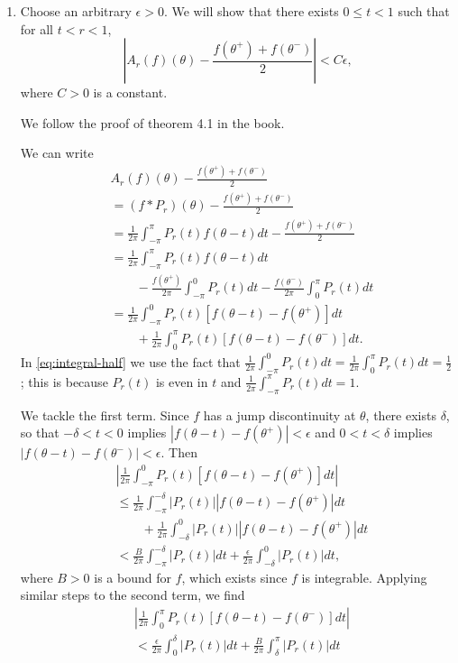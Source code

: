 \documentclass[oneside]{article}
\newcommand\abs[1]{\left|#1\right|}
\begin{document}
  \begin{enumerate}[label=(\alph*)]
    \item
      Choose an arbitrary $\epsilon > 0$. We will show that there exists $0 \leq t < 1$ such that for all $t < r < 1$, \[
        \abs{A_r(f)(\theta) - \frac{f(\theta^+) + f(\theta^-)}{2}} < C\epsilon \text{,}
      \] where $C > 0$ is a constant.

      We follow the proof of theorem 4.1 in the book.

      We can write \begin{align}
        &A_r(f)(\theta) - \frac{f(\theta^+) + f(\theta^-)}{2} \nonumber\\
        &=(f * P_r)(\theta) - \frac{f(\theta^+) + f(\theta^-)}{2} \nonumber\\
        &= \frac{1}{2\pi} \int_{-\pi}^\pi P_r(t)f(\theta - t)dt - \frac{f(\theta^+) + f(\theta^-)}{2} \nonumber\\
        &= \frac{1}{2\pi} \int_{-\pi}^\pi P_r(t)f(\theta - t)dt \label{eq:integral-half}\\
        &\qquad- \frac{f(\theta^+)}{2\pi}\int_{-\pi}^0 P_r(t)dt - \frac{f(\theta^-)}{2\pi}\int_0^\pi P_r(t)dt \nonumber\\
        &= \frac{1}{2\pi}\int_{-\pi}^0 P_r(t)\left[f(\theta-t) - f(\theta^+)\right]dt \nonumber\\
        &\qquad+ \frac{1}{2\pi}\int_0^\pi P_r(t)\left[f(\theta-t) - f(\theta^-)\right]dt \text{.} \nonumber
      \end{align} In \cref{eq:integral-half} we use the fact that $\frac{1}{2\pi}\int_{-\pi}^0 P_r(t)dt = \frac{1}{2\pi}\int_0^\pi P_r(t)dt = \frac{1}{2}$; this is because $P_r(t)$ is even in $t$ and $\frac{1}{2\pi}\int_{-\pi}^\pi P_r(t)dt = 1$.

      We tackle the first term. Since $f$ has a jump discontinuity at $\theta$, there exists $\delta$, so that $-\delta < t < 0$ implies $\abs{f(\theta - t) - f(\theta^+)} < \epsilon$ and $0 < t < \delta$ implies $\abs{f(\theta - t) - f(\theta^-)} < \epsilon$. Then\begin{align*}
        &\abs{\frac{1}{2\pi}\int_{-\pi}^0 P_r(t)\left[f(\theta-t) - f(\theta^+)\right]dt} \\
        &\leq \frac{1}{2\pi} \int_{-\pi}^{-\delta} \abs{P_r(t)} \abs{f(\theta-t) - f(\theta^+)} dt \\
        &\qquad+ \frac{1}{2\pi} \int_{-\delta}^0 \abs{P_r(t)} \abs{f(\theta-t) - f(\theta^+)} dt \\
        &< \frac{B}{2\pi} \int_{-\pi}^{-\delta} \abs{P_r(t)} dt 
        + \frac{\epsilon}{2\pi} \int_{-\delta}^0 \abs{P_r(t)} dt\text{,}
      \end{align*} where $B > 0$ is a bound for $f$, which exists since $f$ is integrable. Applying similar steps to the second term, we find \begin{align*}
        &\abs{\frac{1}{2\pi}\int_0^\pi P_r(t)\left[f(\theta-t) - f(\theta^-)\right]dt} \\
        &< \frac{\epsilon}{2\pi} \int_0^{\delta} \abs{P_r(t)} dt
        + \frac{B}{2\pi} \int_{\delta}^{\pi} \abs{P_r(t)} dt
      \end{align*}


\end{enumerate}
\end{document}

